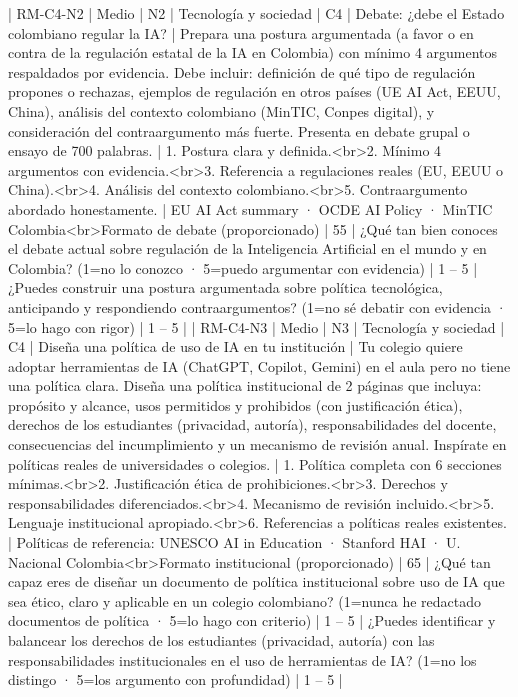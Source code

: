 | RM-C4-N2 | Medio | N2 | Tecnología y sociedad | C4 | Debate: ¿debe el Estado colombiano regular la IA? | Prepara una postura argumentada (a favor o en contra de la regulación estatal de la IA en Colombia) con mínimo 4 argumentos respaldados por evidencia. Debe incluir: definición de qué tipo de regulación propones o rechazas, ejemplos de regulación en otros países (UE AI Act, EEUU, China), análisis del contexto colombiano (MinTIC, Conpes digital), y consideración del contraargumento más fuerte. Presenta en debate grupal o ensayo de 700 palabras. | 1. Postura clara y definida.<br>2. Mínimo 4 argumentos con evidencia.<br>3. Referencia a regulaciones reales (EU, EEUU o China).<br>4. Análisis del contexto colombiano.<br>5. Contraargumento abordado honestamente. | EU AI Act summary · OCDE AI Policy · MinTIC Colombia<br>Formato de debate (proporcionado) | 55 | ¿Qué tan bien conoces el debate actual sobre regulación de la Inteligencia Artificial en el mundo y en Colombia? (1=no lo conozco · 5=puedo argumentar con evidencia) | 1 – 5 | ¿Puedes construir una postura argumentada sobre política tecnológica, anticipando y respondiendo contraargumentos? (1=no sé debatir con evidencia · 5=lo hago con rigor) | 1 – 5 |
| RM-C4-N3 | Medio | N3 | Tecnología y sociedad | C4 | Diseña una política de uso de IA en tu institución | Tu colegio quiere adoptar herramientas de IA (ChatGPT, Copilot, Gemini) en el aula pero no tiene una política clara. Diseña una política institucional de 2 páginas que incluya: propósito y alcance, usos permitidos y prohibidos (con justificación ética), derechos de los estudiantes (privacidad, autoría), responsabilidades del docente, consecuencias del incumplimiento y un mecanismo de revisión anual. Inspírate en políticas reales de universidades o colegios. | 1. Política completa con 6 secciones mínimas.<br>2. Justificación ética de prohibiciones.<br>3. Derechos y responsabilidades diferenciados.<br>4. Mecanismo de revisión incluido.<br>5. Lenguaje institucional apropiado.<br>6. Referencias a políticas reales existentes. | Políticas de referencia: UNESCO AI in Education · Stanford HAI · U. Nacional Colombia<br>Formato institucional (proporcionado) | 65 | ¿Qué tan capaz eres de diseñar un documento de política institucional sobre uso de IA que sea ético, claro y aplicable en un colegio colombiano? (1=nunca he redactado documentos de política · 5=lo hago con criterio) | 1 – 5 | ¿Puedes identificar y balancear los derechos de los estudiantes (privacidad, autoría) con las responsabilidades institucionales en el uso de herramientas de IA? (1=no los distingo · 5=los argumento con profundidad) | 1 – 5 |

